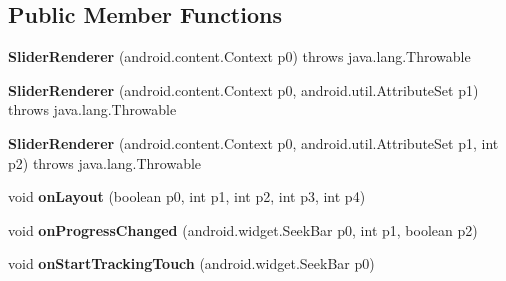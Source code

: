 \subsection*{Public Member Functions}
\begin{DoxyCompactItemize}
\item 
\hypertarget{classmd5282f1122c1313907b9bf274dd2c2f344_1_1SliderRenderer_ab0d7d3e2a12db6cf5cefd9a73a443963}{}{\bfseries Slider\+Renderer} (android.\+content.\+Context p0)  throws java.\+lang.\+Throwable 	\label{classmd5282f1122c1313907b9bf274dd2c2f344_1_1SliderRenderer_ab0d7d3e2a12db6cf5cefd9a73a443963}

\item 
\hypertarget{classmd5282f1122c1313907b9bf274dd2c2f344_1_1SliderRenderer_a97b76e88a275e51743c60abe0d56d0d0}{}{\bfseries Slider\+Renderer} (android.\+content.\+Context p0, android.\+util.\+Attribute\+Set p1)  throws java.\+lang.\+Throwable 	\label{classmd5282f1122c1313907b9bf274dd2c2f344_1_1SliderRenderer_a97b76e88a275e51743c60abe0d56d0d0}

\item 
\hypertarget{classmd5282f1122c1313907b9bf274dd2c2f344_1_1SliderRenderer_a1230883b384440cae309af2b5cd0dc1d}{}{\bfseries Slider\+Renderer} (android.\+content.\+Context p0, android.\+util.\+Attribute\+Set p1, int p2)  throws java.\+lang.\+Throwable 	\label{classmd5282f1122c1313907b9bf274dd2c2f344_1_1SliderRenderer_a1230883b384440cae309af2b5cd0dc1d}

\item 
\hypertarget{classmd5282f1122c1313907b9bf274dd2c2f344_1_1SliderRenderer_a61b1693d7351d1a29afd680b99724846}{}void {\bfseries on\+Layout} (boolean p0, int p1, int p2, int p3, int p4)\label{classmd5282f1122c1313907b9bf274dd2c2f344_1_1SliderRenderer_a61b1693d7351d1a29afd680b99724846}

\item 
\hypertarget{classmd5282f1122c1313907b9bf274dd2c2f344_1_1SliderRenderer_ae78ec5513e0b5e1bb3e2af8592e192c9}{}void {\bfseries on\+Progress\+Changed} (android.\+widget.\+Seek\+Bar p0, int p1, boolean p2)\label{classmd5282f1122c1313907b9bf274dd2c2f344_1_1SliderRenderer_ae78ec5513e0b5e1bb3e2af8592e192c9}

\item 
\hypertarget{classmd5282f1122c1313907b9bf274dd2c2f344_1_1SliderRenderer_a822c6658cada2e9d4108c377ed53640e}{}void {\bfseries on\+Start\+Tracking\+Touch} (android.\+widget.\+Seek\+Bar p0)\label{classmd5282f1122c1313907b9bf274dd2c2f344_1_1SliderRenderer_a822c6658cada2e9d4108c377ed53640e}


\end{DoxyCompactItemize}
